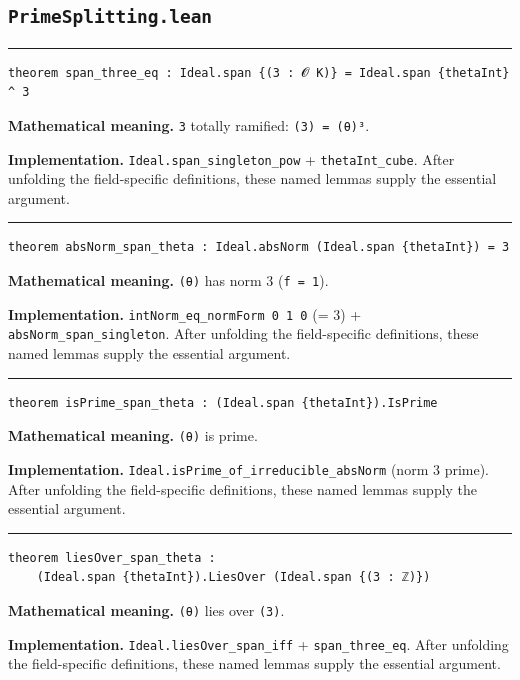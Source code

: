 \documentclass[UTF8,a4paper,11pt,fontset=fandol]{ctexart}
\theoremstyle{definition}
\newcommand{\statementsep}{\par\medskip\hrule\medskip}
\begin{document}
\subsection{\texttt{PrimeSplitting.lean}}

\statementsep
\begin{verbatim}
theorem span_three_eq : Ideal.span {(3 : 𝓞 K)} = Ideal.span {thetaInt} ^ 3
\end{verbatim}
\noindent\textbf{Mathematical meaning.} \texttt{3} totally ramified: \texttt{(3) = (θ)³}.\par
\noindent\textbf{Implementation.} \texttt{Ideal.\allowbreak{}span\_\allowbreak{}singleton\_\allowbreak{}pow} + \texttt{thetaInt\_\allowbreak{}cube}. After unfolding the field-specific definitions, these named lemmas supply the essential argument.\par
\statementsep
\begin{verbatim}
theorem absNorm_span_theta : Ideal.absNorm (Ideal.span {thetaInt}) = 3
\end{verbatim}
\noindent\textbf{Mathematical meaning.} \texttt{(θ)} has norm 3 (\texttt{f = 1}).\par
\noindent\textbf{Implementation.} \texttt{intNorm\_\allowbreak{}eq\_\allowbreak{}normForm 0 1 0} (= 3) + \texttt{absNorm\_\allowbreak{}span\_\allowbreak{}singleton}. After unfolding the field-specific definitions, these named lemmas supply the essential argument.\par
\statementsep
\begin{verbatim}
theorem isPrime_span_theta : (Ideal.span {thetaInt}).IsPrime
\end{verbatim}
\noindent\textbf{Mathematical meaning.} \texttt{(θ)} is prime.\par
\noindent\textbf{Implementation.} \texttt{Ideal.\allowbreak{}isPrime\_\allowbreak{}of\_\allowbreak{}irreducible\_\allowbreak{}absNorm} (norm 3 prime). After unfolding the field-specific definitions, these named lemmas supply the essential argument.\par
\statementsep
\begin{verbatim}
theorem liesOver_span_theta :
    (Ideal.span {thetaInt}).LiesOver (Ideal.span {(3 : ℤ)})
\end{verbatim}
\noindent\textbf{Mathematical meaning.} \texttt{(θ)} lies over \texttt{(3)}.\par
\noindent\textbf{Implementation.} \texttt{Ideal.\allowbreak{}liesOver\_\allowbreak{}span\_\allowbreak{}iff} + \texttt{span\_\allowbreak{}three\_\allowbreak{}eq}. After unfolding the field-specific definitions, these named lemmas supply the essential argument.\par
\end{document}
